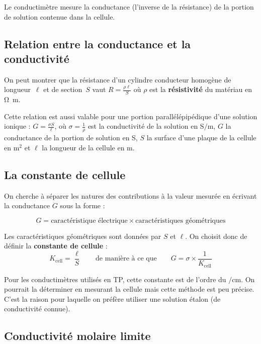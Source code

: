 \documentclass{tp}
\begin{document}
Le conductimètre mesure la conductance (l'inverse de la résistance) de la portion de solution contenue dans la cellule.

\subsection{Relation entre la conductance et la conductivité}

On peut montrer que la résistance d'un cylindre conducteur homogène de longueur~$\ell$ et de section~$S$ vaut $R = \frac{\rho \ell}{S}$ où $\rho$ est la \textbf{résistivité} du matériau en \si{\ohm\meter}.

Cette relation est aussi valable pour une portion parallélépipédique d'une solution ionique : $G = \frac{\sigma S}{\ell}$, où $\sigma=\frac{1}{\rho}$ est la conductivité de la solution en $\si{\siemens\per\meter}$, $G$ la conductance de la portion de solution en S, $S$ la surface d'une plaque de la cellule en $\si{\meter^2}$ et $\ell$ la longueur de la cellule en \si{\meter}.

\subsection{La constante de cellule}

On cherche à séparer les natures des contributions à la valeur mesurée en écrivant la conductance $G$ sous la forme :

\begin{equation}
  G = \text{caractéristique électrique} \times \text{caractéristiques géométriques}
\end{equation}

 Les caractéristiques géométriques sont données par $S$ et $\ell$. On choisit donc de définir la \textbf{constante de cellule} :
\begin{equation}
  K_\text{cell} = \frac{\ell}{S} \qquad \text{de manière à ce que} \qquad G = \sigma \times \frac{1}{K_\text{cell}}
\end{equation}

 Pour les conductimètres utilisés en TP, cette constante est de l'ordre du $\si{\per\centi\meter}$. On pourrait la déterminer en mesurant la cellule mais cette méthode est peu précise. C'est la raison pour laquelle on préfère utiliser une solution étalon (de conductivité connue).


\subsection{Conductivité molaire limite}
\end{document}
